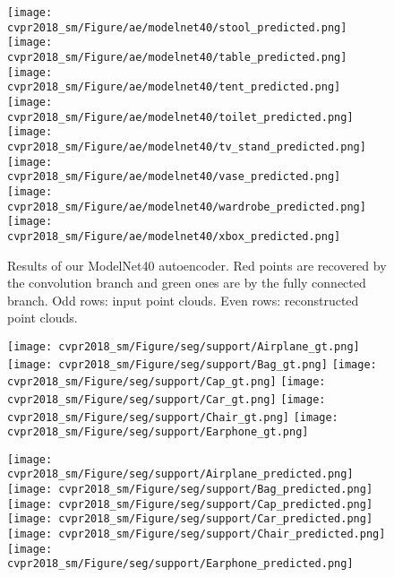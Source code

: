 \documentclass[10pt,twocolumn,letterpaper]{article}
\begin{document}
\begin{figure*}[t]
        \texttt{[image: cvpr2018\_sm/Figure/ae/modelnet40/stool\_predicted.png]}
        \texttt{[image: cvpr2018\_sm/Figure/ae/modelnet40/table\_predicted.png]}
        \texttt{[image: cvpr2018\_sm/Figure/ae/modelnet40/tent\_predicted.png]}
        \texttt{[image: cvpr2018\_sm/Figure/ae/modelnet40/toilet\_predicted.png]}
        \texttt{[image: cvpr2018\_sm/Figure/ae/modelnet40/tv\_stand\_predicted.png]}
        \texttt{[image: cvpr2018\_sm/Figure/ae/modelnet40/vase\_predicted.png]}
        \texttt{[image: cvpr2018\_sm/Figure/ae/modelnet40/wardrobe\_predicted.png]}
        \texttt{[image: cvpr2018\_sm/Figure/ae/modelnet40/xbox\_predicted.png]}
        \caption{Results of our ModelNet40 autoencoder. Red points are recovered by the convolution branch and green ones are by the fully connected branch. Odd rows: input point clouds. Even rows: reconstructed point clouds.}
        \label{fig_ae_modelnet}
        \vspace{-4pt}
\end{figure*}\begin{figure*}[t] 
        \centering
        \texttt{[image: cvpr2018\_sm/Figure/seg/support/Airplane\_gt.png]} \hspace{10pt}
        \texttt{[image: cvpr2018\_sm/Figure/seg/support/Bag\_gt.png]} \hspace{10pt}
        \texttt{[image: cvpr2018\_sm/Figure/seg/support/Cap\_gt.png]} \hspace{10pt}
        \texttt{[image: cvpr2018\_sm/Figure/seg/support/Car\_gt.png]} \hspace{10pt}
        \texttt{[image: cvpr2018\_sm/Figure/seg/support/Chair\_gt.png]} \hspace{10pt}
        \texttt{[image: cvpr2018\_sm/Figure/seg/support/Earphone\_gt.png]}
        
        \texttt{[image: cvpr2018\_sm/Figure/seg/support/Airplane\_predicted.png]} \hspace{10pt}
        \texttt{[image: cvpr2018\_sm/Figure/seg/support/Bag\_predicted.png]} \hspace{10pt}
        \texttt{[image: cvpr2018\_sm/Figure/seg/support/Cap\_predicted.png]} \hspace{10pt}
        \texttt{[image: cvpr2018\_sm/Figure/seg/support/Car\_predicted.png]} \hspace{10pt}
        \texttt{[image: cvpr2018\_sm/Figure/seg/support/Chair\_predicted.png]} \hspace{10pt}
        \texttt{[image: cvpr2018\_sm/Figure/seg/support/Earphone\_predicted.png]}
        

\end{figure*}
\end{document}
